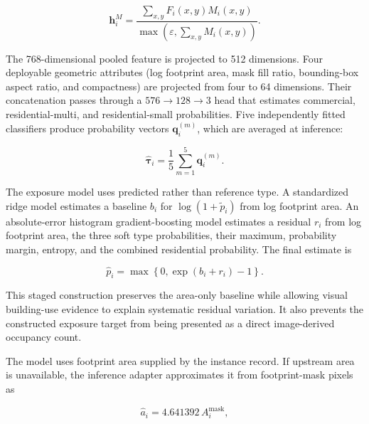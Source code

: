 \begin{equation}
\mathbf{h}_i^{M}=
\frac{\sum_{x,y}F_i(x,y)M_i(x,y)}
{\max\!\left(\varepsilon,\sum_{x,y}M_i(x,y)\right)}.
\label{eq:stage2a_mask_pool}
\end{equation}

The 768-dimensional pooled feature is projected to 512 dimensions. Four deployable geometric attributes (log footprint area, mask fill ratio, bounding-box aspect ratio, and compactness) are projected from four to 64 dimensions. Their concatenation passes through a $576\rightarrow128\rightarrow3$ head that estimates commercial, residential-multi, and residential-small probabilities. Five independently fitted classifiers produce probability vectors $\mathbf{q}_i^{(m)}$, which are averaged at inference:

\begin{equation}
\widehat{\boldsymbol{\tau}}_i=\frac{1}{5}\sum_{m=1}^{5}\mathbf{q}_i^{(m)}.
\label{eq:stage2a_type_ensemble}
\end{equation}

The exposure model uses predicted rather than reference type. A standardized ridge model estimates a baseline $b_i$ for $\log(1+\widetilde{p}_i)$ from log footprint area. An absolute-error histogram gradient-boosting model estimates a residual $r_i$ from log footprint area, the three soft type probabilities, their maximum, probability margin, entropy, and the combined residential probability. The final estimate is

\begin{equation}
\widehat{p}_i=
\max\!\left\{0,\exp\!\left(b_i+r_i\right)-1\right\}.
\label{eq:stage2a_exposure_model}
\end{equation}

This staged construction preserves the area-only baseline while allowing visual building-use evidence to explain systematic residual variation. It also prevents the constructed exposure target from being presented as a direct image-derived occupancy count.

The model uses footprint area supplied by the instance record. If upstream area is unavailable, the inference adapter approximates it from footprint-mask pixels as

\begin{equation}
\widehat{a}_i = 4.641392\,A_i^{\mathrm{mask}},
\label{eq:footprint_fallback}
\end{equation}

